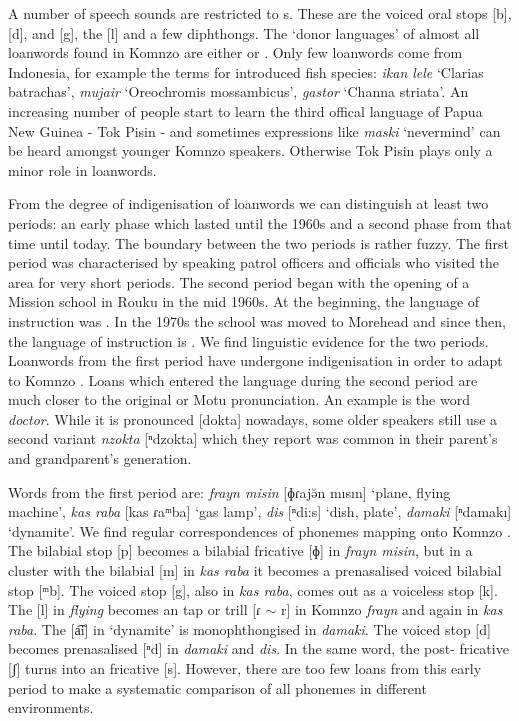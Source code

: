 A number of speech sounds are restricted to s. These are the voiced oral stops [b], [d], and [g], the   [l] and a few diphthongs. The `donor languages' of almost all loanwords found in Komnzo are either  or . Only few loanwords come from  Indonesia, for example the terms for introduced fish species: \emph{ikan lele} `Clarias batrachas', \emph{mujair} `Oreochromis mossambicus', \emph{gastor} `Channa striata'. An increasing number of people start to learn the third offical language of Papua New Guinea - Tok Pisin - and sometimes expressions like \emph{maski} `nevermind' can be heard amongst younger Komnzo speakers. Otherwise Tok Pisin plays only a minor role in loanwords.%

From the degree of indigenisation of loanwords we can distinguish at least two periods: an early phase which lasted until the 1960s and a second phase from that time until today. The boundary between the two periods is rather fuzzy. The first period was characterised by  speaking patrol officers and officials who visited the area for very short periods. The second period began with the opening of a Mission school in Rouku in the mid 1960s. At the beginning, the language of instruction was . In the 1970s the school was moved to Morehead and since then, the language of instruction is . We find linguistic evidence for the two periods. Loanwords from the first period have undergone indigenisation in order to adapt to Komnzo . Loans which entered the language during the second period are much closer to the original  or Motu pronunciation. An example is the word \emph{doctor}. While it is pronounced [dokta] nowadays, some older speakers still use a second variant \emph{nzokta} [ⁿdzokta] which they report was common in their parent's and grandparent's generation.%

Words from the first period are: \emph{frayn misin} [ɸɾajə̆n mısın] `plane, flying machine', \emph{kas raba} [kas ɾaᵐba] `gas lamp', \emph{dis} [ⁿdi:s] `dish, plate', \emph{damaki} [ⁿdamakı] `dynamite'. We find regular correspondences of  phonemes mapping onto Komnzo . The bilabial stop [p] becomes a bilabial fricative [ɸ] in \emph{frayn misin}, but in a cluster with the bilabial  [m] in \emph{kas raba} it becomes a prenasalised voiced bilabial stop [ᵐb]. The  voiced stop [g], also in \emph{kas raba}, comes out as a voiceless  stop [k]. The   [l] in  \emph{flying} becomes an  tap or trill [ɾ $\sim$ r] in Komnzo \emph{frayn} and again in \emph{kas raba}. The   [a͡i] in `dynamite' is monophthongised in \emph{damaki}. The voiced  stop [d] becomes prenasalised [ⁿd] in \emph{damaki} and \emph{dis}. In the same word, the post- fricative [ʃ] turns into an  fricative [s]. However, there are too few loans from this early period to make a systematic comparison of all  phonemes in different environments.%

